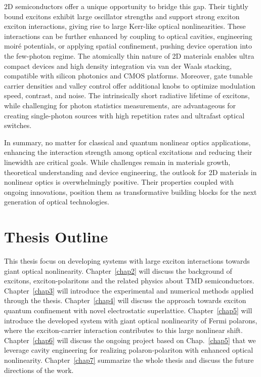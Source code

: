 2D semiconductors offer a unique opportunity to bridge this gap. 
Their tightly bound excitons exhibit large oscillator strengths and support strong exciton exciton interactions, giving rise to large Kerr-like optical nonlinearities\cite{Wang2018-qm}. 
These interactions can be further enhanced by coupling to optical cavities\cite{Datta2022-po,Walther2018-jp}, engineering moiré potentials\cite{Zhang2021-eb}, or applying spatial confinement\cite{Thureja2022-yc}, pushing device operation into the few-photon regime. 
The atomically thin nature of 2D materials enables ultra compact devices and high density integration via van der Waals stacking, compatible with silicon photonics and CMOS platforms\cite{de-Abajo2025-vm}. 
Moreover, gate tunable carrier densities and valley control offer additional knobs to optimize modulation speed, contrast, and noise\cite{Mak2012-le}. 
The intrinsically short radiative lifetime of excitons\cite{Wang2018-zb}, while challenging for photon statistics measurements, are advantageous for creating single-photon sources with high repetition rates and ultrafast optical switches\cite{Korzh2020-ya,Esmaeil-Zadeh2020-mp}. 

In summary, no matter for classical and quantum nonlinear optics applications, enhancing the interaction strength among optical excitations and reducing their linewidth are critical goals.
While challenges remain in materials growth, theoretical understanding and device engineering, the outlook for 2D materials in nonlinear optics is overwhelmingly positive. 
Their properties coupled with ongoing innovations, position them as transformative building blocks for the next generation of optical technologies. 

\section{Thesis Outline}
This thesis focus on developing systems with large exciton interactions towards giant optical nonlinearity.
Chapter~\ref{chap2} will discuss the background of excitons, exciton-polaritons and the related physics about TMD semiconductors. 
Chapter~\ref{chap3} will introduce the experimental and numerical methods applied through the thesis.
Chapter~\ref{chap4} will discuss the approach towards exciton quantum confinement with novel electrostatic superlattice.
Chapter~\ref{chap5} will introduce the developed system with giant optical nonlinearity of Fermi polarons, where the exciton-carrier interaction contributes to this large nonlinear shift.
Chapter~\ref{chap6} will discuss the ongoing project based on Chap.~\ref{chap5} that we leverage cavity engineering for realizing polaron-polariton with enhanced optical nonlinearity.
Chapter~\ref{chap7} summarize the whole thesis and discuss the future directions of the work.


